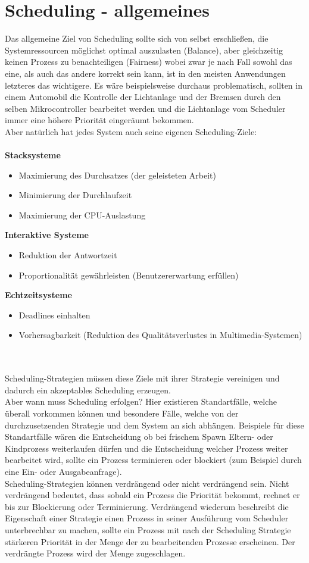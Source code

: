 \section{Scheduling - allgemeines}
Das allgemeine Ziel von Scheduling sollte sich von selbst erschließen, die Systemressourcen möglichst optimal auszulasten (Balance), aber gleichzeitig keinen Prozess zu benachteiligen (Fairness) wobei zwar je nach Fall sowohl das eine, als auch das andere korrekt sein kann, ist in den meisten Anwendungen letzteres das wichtigere. Es wäre beispielsweise durchaus problematisch, sollten in einem Automobil die Kontrolle der Lichtanlage und der Bremsen durch den selben Mikrocontroller bearbeitet werden und die Lichtanlage vom Scheduler immer eine höhere Priorität eingeräumt bekommen. \\
Aber natürlich hat jedes System auch seine eigenen Scheduling-Ziele: \\ \\
\textbf{Stacksysteme}
\begin{itemize}
	\item Maximierung des Durchsatzes (der geleisteten Arbeit)
	\item Minimierung der Durchlaufzeit
	\item Maximierung der CPU-Auslastung
\end{itemize}
\textbf{Interaktive Systeme}
\begin{itemize}
	\item Reduktion der Antwortzeit
	\item Proportionalität gewährleisten (Benutzererwartung erfüllen)
\end{itemize}
\textbf{Echtzeitsysteme}
\begin{itemize}
	\item Deadlines einhalten
	\item Vorhersagbarkeit (Reduktion des Qualitätsverlustes in Multimedia-Systemen)
\end{itemize}
\cite{tanenb2009} \\ \\
Scheduling-Strategien müssen diese Ziele mit ihrer Strategie vereinigen und dadurch ein akzeptables Scheduling erzeugen. \\
Aber wann muss Scheduling erfolgen? Hier existieren Standartfälle, welche überall vorkommen können und besondere Fälle, welche von der durchzusetzenden Strategie und dem System an sich abhängen. Beispiele für diese Standartfälle wären die Entscheidung ob bei frischem Spawn Eltern- oder Kindprozess weiterlaufen dürfen und die Entscheidung welcher Prozess weiter bearbeitet wird, sollte ein Prozess terminieren oder blockiert (zum Beispiel durch eine Ein- oder Ausgabeanfrage). \\
Scheduling-Strategien können verdrängend oder nicht verdrängend sein. Nicht verdrängend bedeutet, dass sobald ein Prozess die Priorität bekommt, rechnet er bis zur Blockierung oder Terminierung. Verdrängend wiederum beschreibt die Eigenschaft einer Strategie einen Prozess in seiner Ausführung vom Scheduler unterbrechbar zu machen, sollte ein Prozess mit nach der Scheduling Strategie stärkeren Priorität in der Menge der zu bearbeitenden Prozesse erscheinen. Der verdrängte Prozess wird der Menge zugeschlagen.
\\
